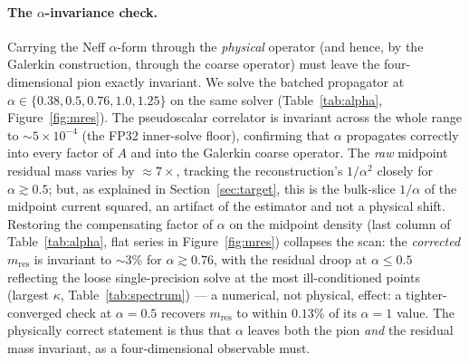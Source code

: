 \documentclass[12pt,a4paper]{article}
\newcommand{\Aop}{A}
\begin{document}
\paragraph{The \texorpdfstring{$\alpha$}{alpha}-invariance check.}
Carrying the Neff $\alpha$-form through the \emph{physical} operator (and hence,
by the Galerkin construction, through the coarse operator) must leave the
four-dimensional pion exactly invariant. We solve the batched propagator at
$\alpha\in\{0.38,0.5,0.76,1.0,1.25\}$ on the same solver (Table~\ref{tab:alpha},
Figure~\ref{fig:mres}). The pseudoscalar correlator is invariant across the whole
range to $\sim5\times10^{-4}$ (the FP32 inner-solve floor), confirming that
$\alpha$ propagates correctly into every factor of $\Aop$ and into the Galerkin
coarse operator. The \emph{raw} midpoint residual mass varies by $\approx7\times$,
tracking the reconstruction's $1/\alpha^2$ closely for $\alpha\gtrsim0.5$; but, as
explained in Section~\ref{sec:target}, this is the bulk-slice $1/\alpha$ of the
midpoint current squared, an artifact of the estimator and not a physical shift.
Restoring the compensating factor of $\alpha$ on the midpoint density (last column
of Table~\ref{tab:alpha}, flat series in Figure~\ref{fig:mres}) collapses the scan:
the \emph{corrected} $m_{\mathrm{res}}$ is invariant to ${\sim}3\%$ for
$\alpha\gtrsim0.76$, with the residual droop at $\alpha\le0.5$ reflecting the loose
single-precision solve at the most ill-conditioned points (largest $\kappa$,
Table~\ref{tab:spectrum}) --- a numerical, not physical, effect: a tighter-converged
check at $\alpha=0.5$ recovers $m_{\mathrm{res}}$ to within $0.13\%$ of its
$\alpha=1$ value. The physically correct statement is thus that $\alpha$ leaves
both the pion \emph{and} the residual mass invariant, as a four-dimensional
observable must.
\end{document}
